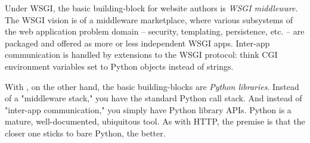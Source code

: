 Under WSGI, the basic building-block for website authors is \emph{WSGI
middleware}. The WSGI vision is of a middleware marketplace, where various
subsystems of the web application problem domain -- security, templating,
persistence, etc. -- are packaged and offered as more or less independent WSGI
apps. Inter-app communication is handled by extensions to the WSGI protocol:
think CGI environment variables set to Python objects instead of strings.

With , on the other hand, the basic building-blocks are
\emph{Python libraries}. Instead of a "middleware stack," you have the standard
Python call stack. And instead of "inter-app communication," you simply have
Python library APIs. Python is a mature, well-documented, ubiquitous tool. As
with HTTP, the premise is that the closer one sticks to bare Python, the better.
